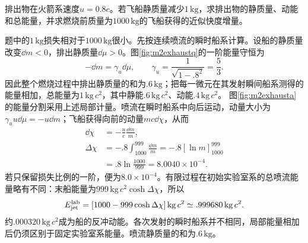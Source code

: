 
\begin{example}\label{ex:m2exhaust}
排出物在火箭系速度$u=0.8c$。若飞船静质量减少$1\,\mathrm{kg}$，求排出物的静质量、动能和总能量，并求燃烧前质量为$1000\,\mathrm{kg}$的飞船获得的近似快度增量。
\end{example}
\begin{solution}
题中的$1\,\mathrm{kg}$损失相对于$1000\,\mathrm{kg}$很小。先按连续喷流的瞬时船系计算。设船的静质量改变$\dd m<0$，排出静质量$\dd\mu>0$。图\ref{fig:m2exhaustq}的一阶能量守恒为
\[
 -\dd m=\gamma_u\dd\mu,\qquad \gamma_u=\frac1{\sqrt{1-.8^2}}=\frac53.
\]
因此整个燃烧过程中排出静质量的和为$.6\,\mathrm{kg}$；把每一微元在其发射瞬间船系测得的能量相加，总能量为$1\,\mathrm{kg}\,c^2$，其中静能$.6\,\mathrm{kg}\,c^2$、动能$.4\,\mathrm{kg}\,c^2$。
图\ref{fig:m2exhausta}的能量分割采用上述局部计量。喷流在瞬时船系中向后运动，动量大小为$\gamma_u u\dd\mu=-u\dd m$；飞船获得向前的动量$mc\dd\chi$，从而
\begin{align*}
 \dd\chi&=-\frac uc\frac{\dd m}{m},\\
 \Delta\chi&=-.8\int_{1000}^{999}\frac{\dd m}{m}
 =-.8[\ln m]_{1000}^{999}\\
 &=.8\ln\frac{1000}{999}=8.0040\times10^{-4}.
\end{align*}
若只保留损失比例的一阶，便为$8.0\times10^{-4}$。有限过程在初始实验室系的总喷流能量略有不同：末船能量为$999\,\mathrm{kg}\,c^2\cosh\Delta\chi$，所以
\[
 E_{\rm jet}^{\rm lab}
 =[1000-999\cosh\Delta\chi]\,\mathrm{kg}\,c^2
 \simeq.999680\,\mathrm{kg}\,c^2.
\]
约$.000320\,\mathrm{kg}\,c^2$成为船的反冲动能。各次发射的瞬时船系并不相同，局部能量相加后仍须区别于固定实验室系能量。喷流静质量的和为$.6\,\mathrm{kg}$。
\end{solution}

